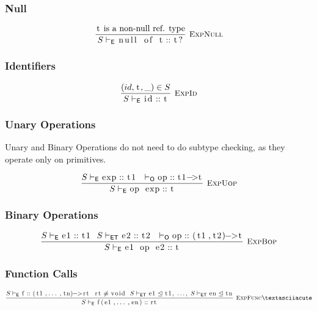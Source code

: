 \documentclass{article}
\newcommand{\code}[1]{\lstinline[columns=fixed]{#1}}
\newcommand{\drmrule}[5]{\frac{#1}{#2\vdash_{\mathsf{#3}}#4}\textsc{\ \small{#5}}}
\newcommand{\ruleapp}[1]{\vdash_{\mathsf{#1}}}
\newcommand{\mc}[1]{\textnormal{\code{#1}}}
\begin{document}
			\subsubsection{Null}
			
				\begin{align*}
					\drmrule{\textnormal{\code{t} is a non-null ref. type}}{S}{E}{\mc{null of t} :: \mc{t?}}{ExpNull}
				\end{align*}
			
			\subsubsection{Identifiers}
			
				\begin{align*}
					\drmrule{(id,\mc{t},\_)\in S}{S}{E}{\mc{id} :: \mc{t}}{ExpId}
				\end{align*}
			
			\subsubsection{Unary Operations}
			
				Unary and Binary Operations do not need to do subtype checking, as they operate only on primitives.
			
				\begin{align*}
					\drmrule{S\ruleapp{E}\mc{exp}::\mc{t1}\ \ \ruleapp{O}\mc{op}::\mc{t1->t}}{S}{E}{\mc{op exp}::\mc{t}}{ExpUop}
				\end{align*}
			
			\subsubsection{Binary Operations}
			
				\begin{align*}
					\drmrule{S\ruleapp{E}\mc{e1}::\mc{t1}\ \ S\ruleapp{ET}\mc{e2}::\mc{t2}\ \ \ruleapp{O}\mc{op}::\mc{(t1,t2)->t}}{S}{E}{\mc{e1 op e2} :: \mc{t}}{ExpBop}
				\end{align*}
			
			\subsubsection{Function Calls}
			
				\begin{align*}
					\drmrule{S\ruleapp{E}\mc{f}::\mc{(t1,...,tn)->rt}\ \ \mc{rt}\not\equiv\mc{void}\ \  S\ruleapp{ET}\mc{e1}\trianglelefteq\mc{t1},\ \dots,\ S\ruleapp{ET}\mc{en}\trianglelefteq\mc{tn}}{S}{E}{\mc{f(e1,...,en)}::\mc{rt}}{ExpFunc}´
				\end{align*}
				
\end{document}
